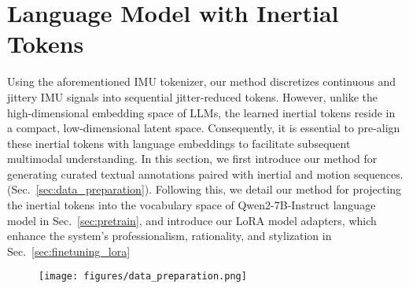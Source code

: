 \section{Language Model with Inertial Tokens}
\label{sec:method2}


Using the aforementioned IMU tokenizer, our method discretizes continuous and jittery IMU signals into sequential jitter-reduced tokens. However, unlike the high-dimensional embedding space of LLMs, the learned inertial tokens reside in a compact, low-dimensional latent space. Consequently, it is essential to pre-align these inertial tokens with language embeddings to facilitate subsequent multimodal understanding. In this section, we first introduce our method for generating curated textual annotations paired with inertial and motion sequences. (Sec.~\ref{sec:data_preparation}). Following this, we detail our method for projecting the inertial tokens into the vocabulary space of Qwen2-7B-Instruct language model \cite{yang2024qwen2} in Sec.~\ref{sec:pretrain}, and introduce our LoRA model adapters, which enhance the system's professionalism, rationality, and stylization in Sec.~\ref{sec:finetuning_lora}

\begin{figure}[t!]
  \centering
  \texttt{[image: figures/data\_preparation.png]}
  \vspace{-20px}
\label{fig:data}
\vspace{-10px}
\end{figure}

